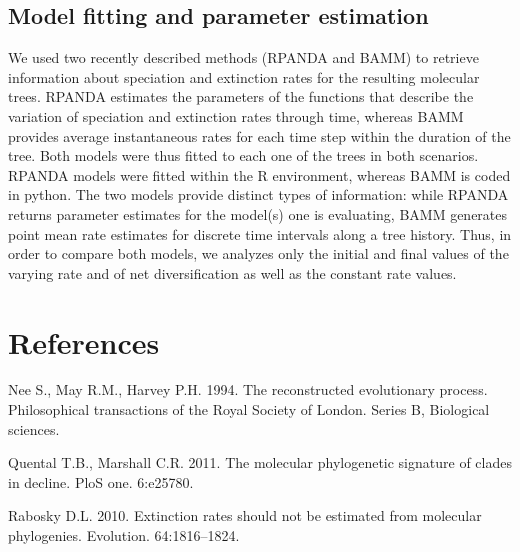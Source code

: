 \documentclass[12pt,]{article}
\begin{document}
\subsection{Model fitting and parameter
estimation}\label{model-fitting-and-parameter-estimation}

We used two recently described methods (RPANDA and BAMM) to retrieve
information about speciation and extinction rates for the resulting
molecular trees. RPANDA estimates the parameters of the functions that
describe the variation of speciation and extinction rates through time,
whereas BAMM provides average instantaneous rates for each time step
within the duration of the tree. Both models were thus fitted to each
one of the trees in both scenarios. RPANDA models were fitted within the
R environment, whereas BAMM is coded in python. The two models provide
distinct types of information: while RPANDA returns parameter estimates
for the model(s) one is evaluating, BAMM generates point mean rate
estimates for discrete time intervals along a tree history. Thus, in
order to compare both models, we analyzes only the initial and final
values of the varying rate and of net diversification as well as the
constant rate values.

\section*{References}\label{references}

Nee S., May R.M., Harvey P.H. 1994. The reconstructed evolutionary
process. Philosophical transactions of the Royal Society of London.
Series B, Biological sciences.

Quental T.B., Marshall C.R. 2011. The molecular phylogenetic signature
of clades in decline. PloS one. 6:e25780.

Rabosky D.L. 2010. Extinction rates should not be estimated from
molecular phylogenies. Evolution. 64:1816--1824.
\end{document}
